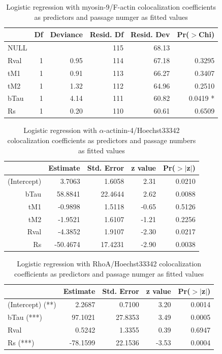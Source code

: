 \documentclass[num-refs]{wiley-article}
\begin{document}
\begin{table}[hbt!]
  \caption{Logistic regression with myosin-9/F-actin colocalization coefficients as predictors and passage numger as fitted values}
\centering
\begin{tabular}{lrrrrr}
  \hline
 & Df & Deviance & Resid. Df & Resid. Dev & Pr($>$Chi) \\
  \hline
NULL &  &  & 115 & 68.13 &  \\
  Rval & 1 & 0.95 & 114 & 67.18 & 0.3295 \\
  tM1 & 1 & 0.91 & 113 & 66.27 & 0.3407 \\
  tM2 & 1 & 1.32 & 112 & 64.96 & 0.2510 \\
  bTau & 1 & 4.14 & 111 & 60.82 & 0.0419 * \\
  Rs & 1 & 0.20 & 110 & 60.61 & 0.6509 \\
   \hline
\end{tabular}
\end{table}

\begin{table}[hbt!]
  \caption{Logistic regression with $\alpha$-actinin-4/Hoechst33342 colocalization coefficients as predictors and passage numbers as fitted values}
\centering
\begin{tabular}{rrrrr}
  \hline
 & Estimate & Std. Error & z value & Pr($>$$|$z$|$) \\
  \hline
(Intercept) & 3.7063 & 1.6058 & 2.31 & 0.0210 \\
  bTau & 58.8841 & 22.4644 & 2.62 & 0.0088 \\
  tM1 & -0.9898 & 1.5118 & -0.65 & 0.5126 \\
  tM2 & -1.9521 & 1.6107 & -1.21 & 0.2256 \\
  Rval & -4.3852 & 1.9107 & -2.30 & 0.0217 \\
  Rs & -50.4674 & 17.4231 & -2.90 & 0.0038 \\
   \hline
\end{tabular}
\end{table}

\begin{table}[hbt!]
  \caption{Logistic regression with RhoA/Hoechst33342 colocalization coefficients as predictors and passage numger as fitted values}
\centering
\begin{tabular}{l|rrrr}
  \hline
 & Estimate & Std. Error & z value & Pr($>$$|$z$|$) \\
  \hline
(Intercept) (**) & 2.2687 & 0.7100 & 3.20 & 0.0014 \\
  bTau (***) & 97.1021 & 27.8353 & 3.49 & 0.0005 \\
  Rval & 0.5242 & 1.3355 & 0.39 & 0.6947 \\
  Rs (***) & -78.1599 & 22.1536 & -3.53 & 0.0004 \\
   \hline
\end{tabular}
\end{table}
\end{document}
